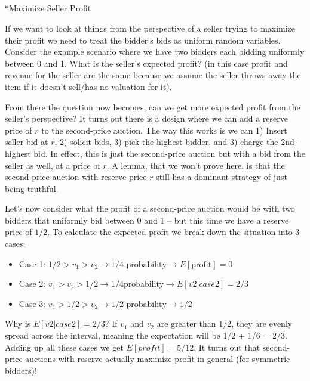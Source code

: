 \documentclass[
  letterpaper,
  numbers=noenddot,
  DIV=11]{scrreprt}
\makeatletter
\let\oldsubparagraph\subparagraph
\renewcommand{\subparagraph}{
    \@ifstar
      \xxxSubParagraphStar
      \xxxSubParagraphNoStar
  }
\newcommand{\xxxSubParagraphStar}[1]{\oldsubparagraph*{#1}\mbox{}}
\newcommand{\xxxSubParagraphNoStar}[1]{\oldsubparagraph{#1}\mbox{}}
\theoremstyle{definition}
\theoremstyle{plain}
\theoremstyle{plain}
\theoremstyle{remark}
\makeatother
\begin{document}
\subparagraph*{Maximize Seller Profit}\label{maximize-seller-profit}

If we want to look at things from the perspective of a seller trying to
maximize their profit we need to treat the bidder's bids as uniform
random variables. Consider the example scenario where we have two
bidders each bidding uniformly between 0 and 1. What is the seller's
expected profit? (in this case profit and revenue for the seller are the
same because we assume the seller throws away the item if it doesn't
sell/has no valuation for it).

From there the question now becomes, can we get more expected profit
from the seller's perspective? It turns out there is a design where we
can add a reserve price of \(r\) to the second-price auction. The way
this works is we can 1) Insert seller-bid at \(r\), 2) solicit bids, 3)
pick the highest bidder, and 3) charge the 2nd-highest bid. In effect,
this is just the second-price auction but with a bid from the seller as
well, at a price of \(r\). A lemma, that we won't prove here, is that
the second-price auction with reserve price \(r\) still has a dominant
strategy of just being truthful.

Let's now consider what the profit of a second-price auction would be
with two bidders that uniformly bid between 0 and 1 -- but this time we
have a reserve price of \(1/2\). To calculate the expected profit we
break down the situation into 3 cases:

\begin{itemize}
\item
  Case 1:
  \(1/2 > v_1 > v_2 \rightarrow 1/4 \text{ probability} \rightarrow  E[\text{profit}] = 0\)
\item
  Case 2:
  \(v_1 > v_2 > 1/2 \rightarrow 1/4 \text{probability} \rightarrow E[v2 | case 2] = 2/3\)
\item
  Case 3:
  \(v_1 > 1/2 > v_2 \rightarrow 1/2 \text{ probability} \rightarrow 1/2\)
\end{itemize}

Why is \(E[v2 | case 2] = 2/3\)? If \(v_1\) and \(v_2\) are greater than
\(1/2\), they are evenly spread across the interval, meaning the
expectation will be 1/2 + 1/6 = 2/3. Adding up all these cases we get
\(E[profit] = 5/12\). It turns out that second-price auctions with
reserve actually maximize profit in general (for symmetric bidders)!
\end{document}
